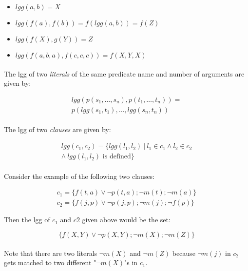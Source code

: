 \documentclass{article}
\theoremstyle{plain}
\theoremstyle{definition}
\begin{document}
\begin{multicols}{2}
\begin{itemize}
\item $lgg(a, b) = X$
\item $lgg(f(a), f(b)) = f(lgg(a, b)) = f(Z)$
\item $lgg(f(X), g(Y)) = Z$
\item $lgg(f(a, b, a), f(c, c, c)) = f(X, Y, X)$
\end{itemize}

\paragraph{} The lgg of two \textit{literals} of the same predicate name and number of arguments are given by:

\begin{align*}
lgg(p(s_1, \dots, s_n), p(t_1, \dots, t_n)) =\\
	p(lgg(s_1, t_1),\dots,lgg(s_n, t_n))
\end{align*}

\paragraph{}The lgg of two \textit{clauses} are given by:

\begin{align*}
lgg(c_1, c_2) = \{lgg(l_1, l_2)\ |\ l_1 \in c_1 \land l_2 \in c_2 \\
\land\ lgg(l_1, l_2) \text{ is defined}\}
\end{align*} 

\paragraph{} Consider the example of the following two clauses:

\begin{align*}
c_1 = \{f(t,a)\lor\lnot p(t, a); \lnot m(t); \lnot m(a)\}\\
c_2 = \{f(j,p)\lor\lnot p(j, p); \lnot m(j); \lnot f(p)\}
\end{align*} 

\noindent Then the lgg of $c_1$ and $c2$ given above would be the set:

$$\{f(X,Y) \lor \lnot p(X, Y); \lnot m(X); \lnot m(Z)\}$$

\paragraph{} Note that there are two literals $\lnot m(X)$ and $\lnot m(Z)$ because $\lnot m(j)$ in $c_2$ gets matched to two different "$\lnot m(X)$"s in $c_1$.


\end{multicols}
\end{document}
